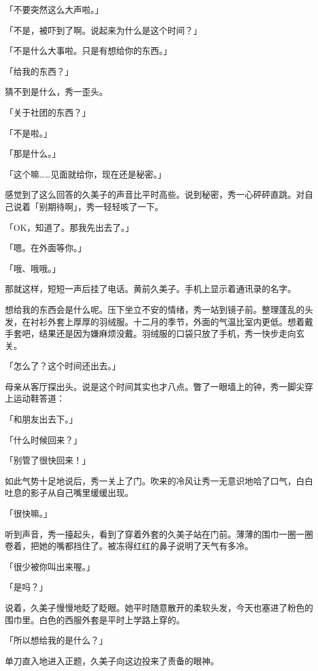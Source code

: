 \documentclass[UTF8]{ctexart}
\begin{document}
    「不要突然这么大声啦。」

    「不是，被吓到了啊。说起来为什么是这个时间？」

    「不是什么大事啦。只是有想给你的东西。」

    「给我的东西？」

    猜不到是什么，秀一歪头。

    「关于社团的东西？」

    「不是啦。」

    「那是什么。」

    「这个嘛……见面就给你，现在还是秘密。」

    感觉到了这么回答的久美子的声音比平时高些。说到秘密，秀一心砰砰直跳。对自己说着「别期待啊」，秀一轻轻咳了一下。

    「OK，知道了。那我先出去了。」

    「嗯。在外面等你。」

    「哦、哦哦。」

    那就这样，短短一声后挂了电话。黄前久美子。手机上显示着通讯录的名字。

    想给我的东西会是什么呢。压下坐立不安的情绪，秀一站到镜子前。整理蓬乱的头发，在衬衫外套上厚厚的羽绒服。十二月的季节，外面的气温比室内更低。想着戴手套吧，结果还是因为嫌麻烦没戴。羽绒服的口袋只放了手机，秀一快步走向玄关。

    「怎么了？这个时间还出去。」

    母亲从客厅探出头。说是这个时间其实也才八点。瞥了一眼墙上的钟，秀一脚尖穿上运动鞋答道：

    「和朋友出去下。」

    「什么时候回来？」

    「别管了很快回来！」

    如此气势十足地说后，秀一关上了门。吹来的冷风让秀一无意识地哈了口气，白白吐息的影子从自己嘴里缓缓出现。

    「很快嘛。」

    听到声音，秀一擡起头，看到了穿着外套的久美子站在门前。薄薄的围巾一圈一圈卷着，把她的嘴都挡住了。被冻得红红的鼻子说明了天气有多冷。

    「很少被你叫出来喔。」

    「是吗？」

    说着，久美子慢慢地眨了眨眼。她平时随意散开的柔软头发，今天也塞进了粉色的围巾里。白色的西服外套是平时上学路上穿的。

    「所以想给我的是什么？」

    单刀直入地进入正题，久美子向这边投来了责备的眼神。
\end{document}

